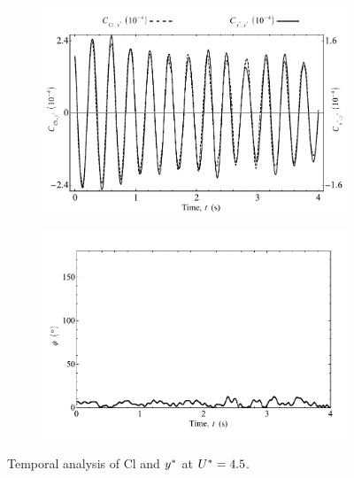 \documentclass[oneside]{utmthesis}
\begin{document}
\begin{figure}
  \centering
  \begin{subfigure}[h]{1\textwidth}
    \includegraphics[width=\textwidth]{figs/tempAnalysisKVIV-a}
    \caption{}
    \label{fig:tempAnalysisKVIV-a}
  \end{subfigure}

  \begin{subfigure}[h]{1\textwidth}
    \includegraphics[width=\textwidth]{figs/tempAnalysisKVIV-b}
    \caption{}
    \label{fig:tempAnalysisKVIV-b}
  \end{subfigure}

  \caption{Temporal analysis of Cl and $y^{*}$ at $U^{*} = 4.5$.} 
\end{figure}
\end{document}

